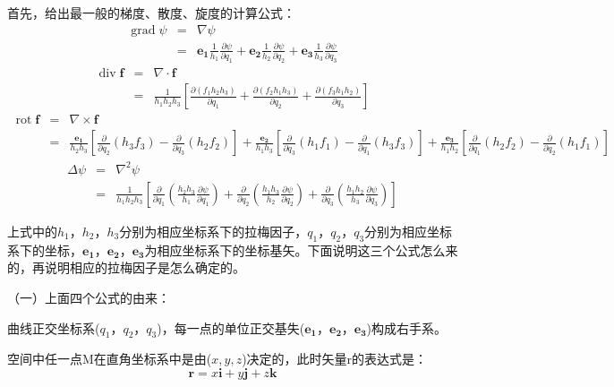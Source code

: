 \documentclass[UTF8]{ctexart}
\newcommand{\tmmathbf}[1]{\ensuremath{\boldsymbol{#1}}}
\newcommand{\tmop}[1]{\ensuremath{\operatorname{#1}}}
\begin{document}
首先，给出最一般的梯度、散度、旋度的计算公式：
\begin{eqnarray}
  \tmop{grad} \psi & = & \nabla \psi \nonumber\\
  & = & \tmmathbf{e_1} \frac{1}{h_1} \frac{\partial \psi}{\partial q_1} +
  \tmmathbf{e_2} \frac{1}{h_2} \frac{\partial \psi}{\partial q_2} +
  \tmmathbf{e_3} \frac{1}{h_3} \frac{\partial \psi}{\partial q_3} 
\end{eqnarray}
\begin{eqnarray}
  \tmop{div} \tmmathbf{f} & = & \nabla \cdot \tmmathbf{f} \nonumber\\
  & = & \frac{1}{h_1 h_2 h_3} \left[ \frac{\partial (f_1 h_2 h_3)}{\partial
  q_1} + \frac{\partial (f_2 h_1 h_3)}{\partial q_2} + \frac{\partial (f_3 h_1
  h_2)}{\partial q_3} \right] 
\end{eqnarray}
\begin{eqnarray*}
  \tmop{rot} \tmmathbf{f} & = & \nabla \times \tmmathbf{f}\\
  & = & \frac{\tmmathbf{e_1}}{h_2 h_3} \left[ \frac{\partial}{\partial q_2}
  (h_3 f_3) - \frac{\partial}{\partial q_3} (h_2 f_2) \right] +
  \frac{\tmmathbf{e_2}}{h_1 h_3} \left[ \frac{\partial}{\partial q_3} (h_1
  f_1) - \frac{\partial}{\partial q_1} (h_3 f_3) \right] +
  \frac{\tmmathbf{e_3}}{h_1 h_2} \left[ \frac{\partial}{\partial q_1} (h_2
  f_2) - \frac{\partial}{\partial q_2} (h_1 f_1) \right]
\end{eqnarray*}
\begin{eqnarray*}
  \Delta \psi & = & \nabla^2 \psi\\
  & = & \frac{1}{h_1 h_2 h_3} \left[ \frac{\partial}{\partial q_1} \left(
  \frac{h_2 h_3}{h_1} \frac{\partial \psi}{\partial q_1} \right) +
  \frac{\partial}{\partial q_2} \left( \frac{h_1 h_3}{h_2} \frac{\partial
  \psi}{\partial q_2} \right) + \frac{\partial}{\partial q_3} \left( \frac{h_1
  h_2}{h_3} \frac{\partial \psi}{\partial q_3} \right) \right]
\end{eqnarray*}


上式中的$h_1 ，h_2
，h_3$分别为相应坐标系下的拉梅因子，$q_1 ，q_2
，q_3$分别为相应坐标系下的坐标，$\tmmathbf{e_1} ，
\tmmathbf{e_2} ，
\tmmathbf{e_3}$为相应坐标系下的坐标基矢。下面说明这三个公式怎么来的，再说明相应的拉梅因子是怎么确定的。

（一）上面四个公式的由来：

曲线正交坐标系($q_1 ，q_2
，q_3$)，每一点的单位正交基失($\tmmathbf{e_1} ， \tmmathbf{e_2}
， \tmmathbf{e_3}$)构成右手系。

空间中任一点M在直角坐标系中是由($x, y,
z$)决定的，此时矢量r的表达式是：
\[ \tmmathbf{r =} x \tmmathbf{i} + y \tmmathbf{j} + z \tmmathbf{k} \]
\end{document}
